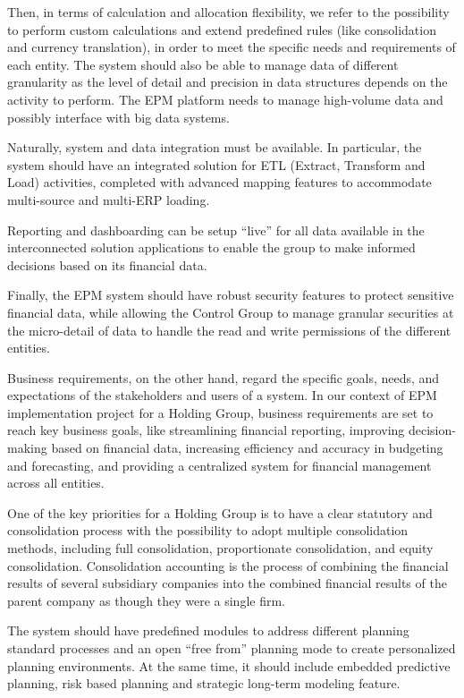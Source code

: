 \documentclass[12pt,a4paper,openright,twoside]{book}
\begin{document}
Then, in terms of calculation and allocation flexibility, we refer to the possibility to perform custom calculations and extend predefined rules (like consolidation and currency translation), in order to meet the specific needs and requirements of each entity.
%
The system should also be able to manage data of different granularity as the level of detail and precision in data structures depends on the activity to perform.
%
The EPM platform needs to manage high-volume data and possibly interface with big data systems.

Naturally, system and data integration must be available.
%
In particular, the system should have an integrated solution for ETL (Extract, Transform and Load) activities, completed with advanced mapping features to accommodate multi-source and multi-ERP loading.

Reporting and dashboarding can be setup ``live'' for all data available in the interconnected solution
applications to enable the group to make informed decisions based on its financial data.

Finally, the EPM system should have robust security features to protect sensitive financial data, while allowing the Control Group to manage granular securities at the micro-detail of data to handle the read and write permissions of the different entities.

Business requirements, on the other hand, regard the specific goals, needs, and expectations of the stakeholders and users of a system. 
%
In our context of EPM implementation project for a Holding Group, business requirements are set to reach key business goals, like streamlining financial reporting, improving decision-making based on financial data, increasing efficiency and accuracy in budgeting and forecasting, and providing a centralized system for financial management across all entities. 

One of the key priorities for a Holding Group is to have a clear statutory and consolidation process with the possibility to adopt multiple consolidation methods, including full consolidation, proportionate consolidation, and equity consolidation.
%
Consolidation accounting is the process of combining the financial results of several subsidiary companies into the combined financial results of the parent company as though they were a single firm.

The system should have predefined modules to address different planning standard processes and an open ``free from'' planning mode to create personalized planning environments. 
%
At the same time, it should include embedded predictive planning, risk based planning and strategic  long-term modeling feature.
\end{document}
